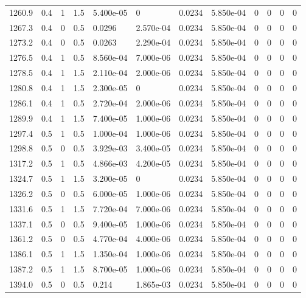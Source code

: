 \documentclass[preview]{standalone}
\begin{document}
{{{{{{{\begin{tabular}{L{1.2cm}C{1.2cm} C{0.3cm}C{0.5cm} C{1.4cm}C{1.4cm} C{1.4cm}C{1.4cm} C{1.6cm}C{1.6cm} C{1.6cm}C{1.6cm}}
  1260.9  &   0.4  & 1     & 1.5 &  5.400e-05  & 0  &  0.0234&   5.850e-04& 0 & 0   &  0 & 0  \\ 
  1267.3  &   0.4  & 0     & 0.5 &  0.0296  & 2.570e-04  &  0.0234&   5.850e-04& 0 & 0   &  0 & 0  \\ 
  1273.2  &   0.4  & 0     & 0.5 &  0.0263  & 2.290e-04  &  0.0234&   5.850e-04& 0 & 0   &  0 & 0  \\ 
  1276.5  &   0.4  & 1     & 0.5 &  8.560e-04  & 7.000e-06  &  0.0234&   5.850e-04& 0 & 0   &  0 & 0  \\ 
  1278.5  &   0.4  & 1     & 1.5 &  2.110e-04  & 2.000e-06  &  0.0234&   5.850e-04& 0 & 0   &  0 & 0  \\ 
  1280.8  &   0.4  & 1     & 1.5 &  2.300e-05  & 0  &  0.0234&   5.850e-04& 0 & 0   &  0 & 0  \\ 
  1286.1  &   0.4  & 1     & 0.5 &  2.720e-04  & 2.000e-06  &  0.0234&   5.850e-04& 0 & 0   &  0 & 0  \\ 
  1289.9  &   0.4  & 1     & 1.5 &  7.400e-05  & 1.000e-06  &  0.0234&   5.850e-04& 0 & 0   &  0 & 0  \\ 
  1297.4  &   0.5  & 1     & 0.5 &  1.000e-04  & 1.000e-06  &  0.0234&   5.850e-04& 0 & 0   &  0 & 0  \\ 
  1298.8  &   0.5  & 0     & 0.5 &  3.929e-03  & 3.400e-05  &  0.0234&   5.850e-04& 0 & 0   &  0 & 0  \\ 
  1317.2  &   0.5  & 1     & 0.5 &  4.866e-03  & 4.200e-05  &  0.0234&   5.850e-04& 0 & 0   &  0 & 0  \\ 
  1324.7  &   0.5  & 1     & 1.5 &  3.200e-05  & 0  &  0.0234&   5.850e-04& 0 & 0   &  0 & 0  \\ 
  1326.2  &   0.5  & 0     & 0.5 &  6.000e-05  & 1.000e-06  &  0.0234&   5.850e-04& 0 & 0   &  0 & 0  \\ 
  1331.6  &   0.5  & 1     & 1.5 &  7.720e-04  & 7.000e-06  &  0.0234&   5.850e-04& 0 & 0   &  0 & 0  \\ 
  1337.1  &   0.5  & 0     & 0.5 &  9.400e-05  & 1.000e-06  &  0.0234&   5.850e-04& 0 & 0   &  0 & 0  \\ 
  1361.2  &   0.5  & 0     & 0.5 &  4.770e-04  & 4.000e-06  &  0.0234&   5.850e-04& 0 & 0   &  0 & 0  \\ 
  1386.1  &   0.5  & 1     & 1.5 &  1.350e-04  & 1.000e-06  &  0.0234&   5.850e-04& 0 & 0   &  0 & 0  \\ 
  1387.2  &   0.5  & 1     & 1.5 &  8.700e-05  & 1.000e-06  &  0.0234&   5.850e-04& 0 & 0   &  0 & 0  \\ 
  1394.0  &   0.5  & 0     & 0.5 &  0.214  & 1.865e-03  &  0.0234&   5.850e-04& 0 & 0   &  0 & 0  \\ 

\end{tabular}}}}}}}}
\end{document}
